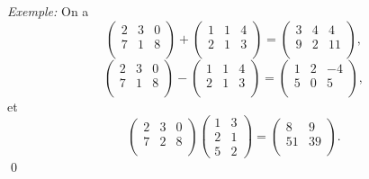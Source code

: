 \emph{Exemple:}
On a $$\begin{pmatrix} 2 & 3 & 0 \\ 7 & 1 & 8 \\ \end{pmatrix}+\begin{pmatrix} 1 & 1 & 4 \\ 2 & 1 & 3 \\ \end{pmatrix}=\begin{pmatrix} 3 & 4 & 4 \\ 9 & 2 & 11 \\ \end{pmatrix},$$
$$\begin{pmatrix} 2 & 3 & 0 \\ 7 & 1 & 8 \\ \end{pmatrix}-\begin{pmatrix} 1 & 1 & 4 \\ 2 & 1 & 3 \\ \end{pmatrix}=\begin{pmatrix} 1 & 2 & -4 \\5 & 0 & 5 \\ \end{pmatrix},$$
et $$\begin{pmatrix} 2 & 3 & 0 \\ 7 & 2 & 8 \\ \end{pmatrix}\begin{pmatrix} 1 & 3 \\ 2 & 1 \\ 5 & 2 \end{pmatrix}=\begin{pmatrix} 8 & 9 \\ 51 & 39 \\ \end{pmatrix}.$$ \qed



